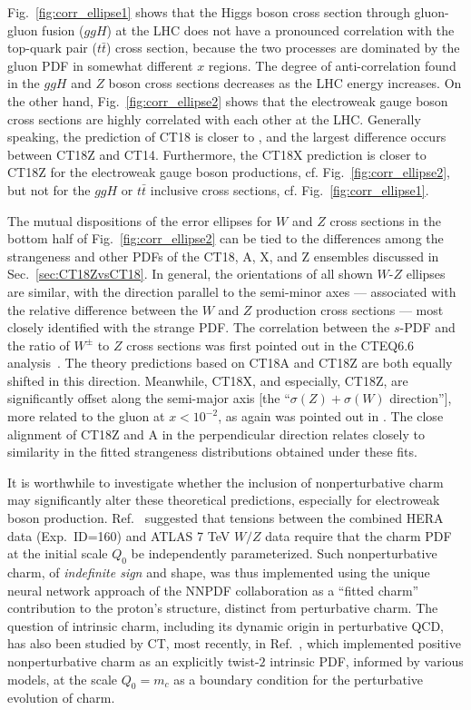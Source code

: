 Fig.~\ref{fig:corr_ellipse1} shows that the Higgs boson cross section through
gluon-gluon fusion ($ggH$) at the LHC does not have a pronounced correlation 
with the top-quark pair ($t \bar t$) cross section, because the two processes are dominated by the gluon
PDF in somewhat different $x$ regions. 
The degree of anti-correlation found in the $ggH$ and $Z$ boson cross sections decreases as the LHC energy increases. 
On the other hand, Fig.~\ref{fig:corr_ellipse2} shows that the electroweak gauge boson cross sections are highly correlated with each other at the LHC.
Generally speaking, the prediction of CT18 is closer to \CTHERAII, and the largest difference occurs between CT18Z and CT14. 
Furthermore, the CT18X prediction is closer to CT18Z for the electroweak gauge boson productions, cf. Fig.~\ref{fig:corr_ellipse2}, but not for the $ggH$ or $t \bar t$ inclusive cross sections, cf. Fig.~\ref{fig:corr_ellipse1}.

The mutual dispositions of the error ellipses for $W$ and $Z$ cross sections in the bottom half of Fig.~\ref{fig:corr_ellipse2} can be tied to the differences among the strangeness and other PDFs of the CT18, A, X, and Z ensembles discussed in Sec.~\ref{sec:CT18ZvsCT18}. In general, the orientations of all shown $W$-$Z$ ellipses are similar, with
the direction parallel to the semi-minor axes --- associated with the relative difference between the $W$ and
$Z$ production cross sections --- most closely identified with the strange PDF. 
The correlation between the $s$-PDF and the ratio of $W^\pm$ to $Z$ cross sections was first pointed out in the CTEQ6.6 analysis~\cite{Nadolsky:2008zw}.
The theory predictions based on
CT18A and CT18Z are both equally shifted in this direction. Meanwhile, CT18X, and especially, CT18Z, are
significantly offset along the semi-major axis [the ``$\sigma(Z)\!+\!\sigma(W)$ direction''], more related to the gluon at $x<10^{-2}$, as again was pointed out in \cite{Nadolsky:2008zw}. 
The close alignment of CT18Z and A in the perpendicular direction relates closely to similarity in the fitted strangeness
distributions obtained under these fits.

It is worthwhile to investigate whether the inclusion of nonperturbative charm may significantly alter these theoretical predictions, especially for electroweak boson production.  Ref.~\cite{Ball:2017nwa} suggested that tensions between the combined HERA data (Exp.~ID=160) and
ATLAS 7 TeV $W/Z$ data require that the charm PDF at the initial scale $Q_0$ be independently parameterized.  Such nonperturbative charm, of 
{\it indefinite sign} and shape, was thus implemented using the unique neural network approach of the NNPDF collaboration as a ``fitted charm'' contribution to the proton's structure, distinct from perturbative charm.  The question of intrinsic charm, including its dynamic origin in perturbative QCD, has also been studied by CT, most recently, in Ref.~\cite{Hou:2017khm}, which implemented positive nonperturbative charm as an explicitly twist-$2$ intrinsic PDF, informed by various models, at the scale $Q_0=m_c$ as a boundary condition for the perturbative evolution of charm.  

